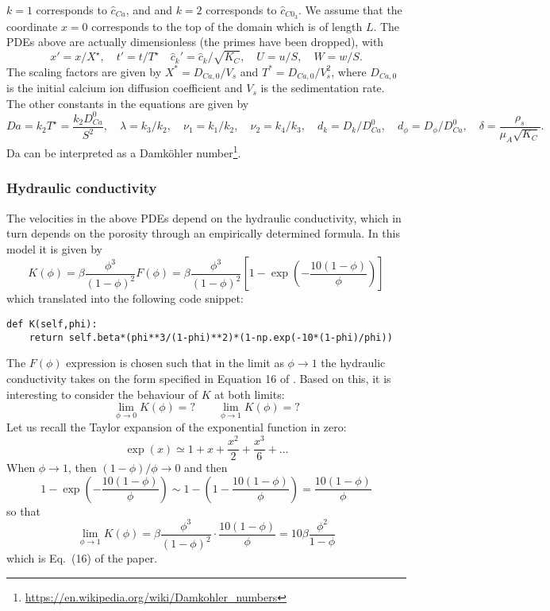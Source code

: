 \documentclass[a4paper]{article}
\begin{document}
$k=1$ corresponds to $\hat{c}_{Ca}$, and and $k=2$ corresponds to $\hat{c}_{C0_3}$.
We assume that the coordinate $x=0$ corresponds to the top of the domain
which is of length $L$. 
The PDEs above are actually dimensionless (the primes have been dropped), with 
\[
x'=x/X^\star, \quad t'=t/T^\star \quad \hat{c}_k'=\hat{c}_k/\sqrt{K_C},
\quad U=u/S, \quad W=w/S.
\]
The scaling factors are given by $X^* = D_{Ca,0} / V_s$ and $T^* = D_{Ca,0} / V_s^2 $, where $D_{Ca,0}$ is the initial calcium ion diffusion coefficient and $V_s$ is the sedimentation rate. The other constants in the equations are given by 
\[
Da=k_2 T^\star = \frac{k_2 D_{Ca}^0}{S^2},
\quad
\lambda=k_3/k_2,
\quad
\nu_1=k_1/k_2,
\quad
\nu_2=k_4/k_3,
\quad
d_k=D_k/D_{Ca}^0, 
\quad
d_\phi=D_\phi/D_{Ca}^0,
\quad
\delta=\frac{\rho_s}{\mu_A \sqrt{K_C}}.
\]
Da can be interpreted as a Damköhler number\footnote{\url{https://en.wikipedia.org/wiki/Damkohler_numbers}}. 


\subsubsection*{Hydraulic conductivity}
The velocities in the above PDEs depend on the hydraulic conductivity, which in turn depends on the porosity through an empirically determined formula.  In this model it is given by
\[
K(\phi)
=\beta \frac{\phi^3}{(1-\phi)^2} F(\phi)
=\beta \frac{\phi^3}{(1-\phi)^2} \left[ 1-\exp\left( -\frac{10(1-\phi)}{\phi} \right) \right] 
\]
which translated into the following code snippet:
\begin{lstlisting}
def K(self,phi):
    return self.beta*(phi**3/(1-phi)**2)*(1-np.exp(-10*(1-phi)/phi))
\end{lstlisting}
The $F(\phi)$ expression is chosen such that in the limit as $\phi \rightarrow 1$ the hydraulic conductivity takes on the form specified in Equation 16 of \cite{lheu18}.  Based on this, it is interesting to consider the behaviour of $K$ at both limits:
\[
\lim_{\phi\rightarrow 0} K(\phi) = ?
\qquad
\lim_{\phi\rightarrow 1} K(\phi) = ?
\]
Let us recall the Taylor expansion of the exponential function in zero:
\[
\exp (x) \simeq 1 + x + \frac{x^2}{2} + \frac{x^3}{6} + \dots
\]
When $\phi \rightarrow 1$, then $(1-\phi)/\phi \rightarrow 0$ and then 
\[
1-\exp\left( -\frac{10(1-\phi)}{\phi} \right) \sim 1- (1 -\frac{10(1-\phi)}{\phi} ) = \frac{10(1-\phi)}{\phi}
\]
so that 
\[
\lim_{\phi\rightarrow 1} K(\phi) = \beta \frac{\phi^3}{(1-\phi)^2} \cdot \frac{10(1-\phi)}{\phi}
=10 \beta \frac{\phi^2}{1-\phi}
\]
which is Eq.~(16) of the paper.
\end{document}
